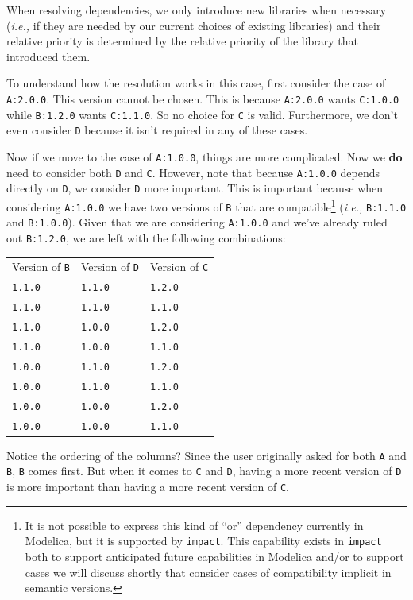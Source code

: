 \documentclass[11pt,a4paper,twocolumn]{article}
\renewcommand{\small}{\fontsize{9.5pt}{11.1pt}\selectfont}
\newcommand{\code}[1]{\texttt{#1}} %
\begin{document}
When resolving dependencies, we only introduce new libraries when
necessary (\emph{i.e.,} if they are needed by our current choices of
existing libraries) and their relative priority is determined by the
relative priority of the library that introduced them.

To understand how the resolution works in this case, first consider
the case of \code{A:2.0.0}.  This version cannot be chosen.  This is
because \code{A:2.0.0} wants \code{C:1.0.0} while \code{B:1.2.0}
wants \code{C:1.1.0}.  So no choice for \code{C} is valid.
Furthermore, we don't even consider \code{D} because it isn't
required in any of these cases.

Now if we move to the case of \code{A:1.0.0}, things are more
complicated.  Now we \textbf{do} need to consider both \code{D} and
\code{C}.  However, note that because \code{A:1.0.0} depends
directly on \code{D}, we consider \code{D} more important.  This is
important because when considering \code{A:1.0.0} we have two
versions of \code{B} that are compatible\footnote{It is not possible
  to express this kind of ``or'' dependency currently in Modelica, but
  it is supported by \code{impact}.  This capability exists in
  \code{impact} both to support anticipated future capabilities in
  Modelica \parencite{impact-MCP} and/or to support cases we will discuss shortly
  that consider cases of compatibility implicit in semantic versions.}
(\emph{i.e.,} \code{B:1.1.0} and \code{B:1.0.0}).  Given that we are
considering \code{A:1.0.0} and we've already ruled out \code{B:1.2.0},
we are left with the following combinations:
{\small
\begin{center}
\begin{tabular}{lll}
  Version of \code{B} & Version of \code{D} & Version of \code{C} \\
  \code{1.1.0} & \code{1.1.0} & \code{1.2.0} \\
  \code{1.1.0} & \code{1.1.0} & \code{1.1.0} \\
  \code{1.1.0} & \code{1.0.0} & \code{1.2.0} \\
  \code{1.1.0} & \code{1.0.0} & \code{1.1.0} \\
  \code{1.0.0} & \code{1.1.0} & \code{1.2.0} \\
  \code{1.0.0} & \code{1.1.0} & \code{1.1.0} \\
  \code{1.0.0} & \code{1.0.0} & \code{1.2.0} \\
  \code{1.0.0} & \code{1.0.0} & \code{1.1.0} \\
\end{tabular}
\end{center}
}
Notice the ordering of the columns?  Since the user originally asked
for both \code{A} and \code{B}, \code{B} comes first.  But when it
comes to \code{C} and \code{D}, having a more recent version of
\code{D} is more important than having a more recent version of
\code{C}.
\end{document}
